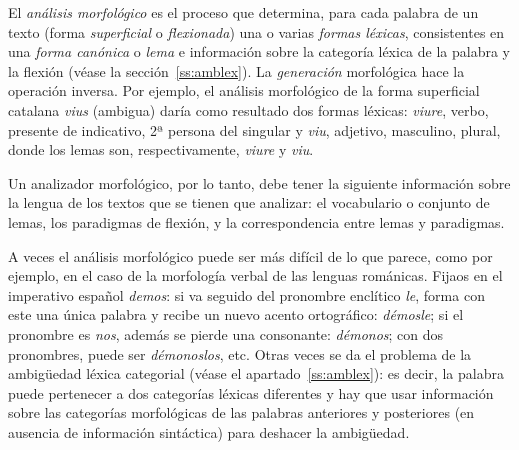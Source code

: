 El \emph{análisis morfológico} es el proceso que determina, para cada palabra de un texto (forma \emph{superficial} o \emph{flexionada}) una o varias \emph{formas léxicas}, consistentes en una \emph{forma canónica} o \emph{lema} e información sobre la categoría léxica de la palabra y la flexión (véase la sección~\ref{ss:amblex}). La {\em generación} morfológica hace la operación inversa. Por ejemplo, el análisis morfológico de la forma superficial catalana \emph{vius} (ambigua) daría como resultado dos formas léxicas: \emph{viure}, verbo, presente de indicativo, 2ª persona del singular y \emph{viu}, adjetivo, masculino, plural, donde los lemas son, respectivamente, \emph{viure} y \emph{viu}. 

Un analizador morfológico, por lo tanto, debe tener la siguiente información sobre la lengua de los textos que se tienen que analizar: el vocabulario o conjunto de lemas, los paradigmas de flexión, y la correspondencia entre lemas y paradigmas. 

A veces el análisis morfológico puede ser más difícil de lo que parece, como por ejemplo, en el caso de la morfología verbal de las lenguas románicas. Fijaos en el imperativo español \emph{demos}: si va seguido del pronombre enclítico \emph{le}, forma con este una única palabra y recibe un nuevo acento ortográfico: \emph{démosle}; si el pronombre es \emph{nos}, además se pierde una consonante: \emph{démonos}; con dos pronombres, puede ser {\em démonoslos}, etc. Otras veces se da el problema de la ambigüedad léxica categorial (véase el apartado~\ref{ss:amblex}): es decir, la palabra puede pertenecer a dos categorías léxicas diferentes y hay que usar información sobre las categorías morfológicas de las palabras anteriores y posteriores (en ausencia de información sintáctica) para deshacer la ambigüedad. 

